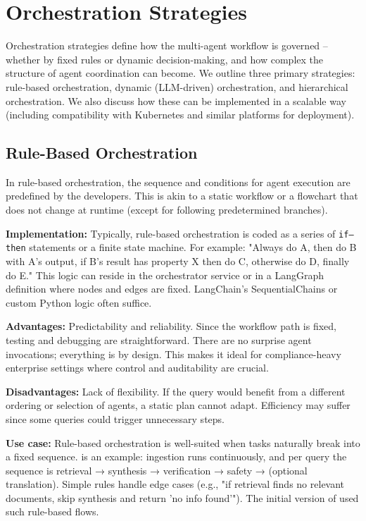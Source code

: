 \section{Orchestration Strategies}

Orchestration strategies define how the multi-agent workflow is governed – whether by fixed rules or dynamic decision-making, and how complex the structure of agent coordination can become. We outline three primary strategies: rule-based orchestration, dynamic (LLM-driven) orchestration, and hierarchical orchestration. We also discuss how these can be implemented in a scalable way (including compatibility with Kubernetes and similar platforms for deployment).

\subsection{Rule-Based Orchestration}
In rule-based orchestration, the sequence and conditions for agent execution are predefined by the developers. This is akin to a static workflow or a flowchart that does not change at runtime (except for following predetermined branches).  

\textbf{Implementation:} Typically, rule-based orchestration is coded as a series of \texttt{if–then} statements or a finite state machine. For example: "Always do A, then do B with A's output, if B's result has property X then do C, otherwise do D, finally do E." This logic can reside in the orchestrator service or in a LangGraph definition \cite{langchain} where nodes and edges are fixed. LangChain's SequentialChains \cite{blogLangChain} or custom Python logic often suffice.  

\textbf{Advantages:} Predictability and reliability. Since the workflow path is fixed, testing and debugging are straightforward. There are no surprise agent invocations; everything is by design. This makes it ideal for compliance-heavy enterprise settings where control and auditability are crucial.  

\textbf{Disadvantages:} Lack of flexibility. If the query would benefit from a different ordering or selection of agents, a static plan cannot adapt. Efficiency may suffer since some queries could trigger unnecessary steps.  

\textbf{Use case:} Rule-based orchestration is well-suited when tasks naturally break into a fixed sequence. \ishtar{} is an example: ingestion runs continuously, and per query the sequence is retrieval → synthesis → verification → safety → (optional translation). Simple rules handle edge cases (e.g., "if retrieval finds no relevant documents, skip synthesis and return 'no info found'"). The initial version of \ishtar{} used such rule-based flows.  

